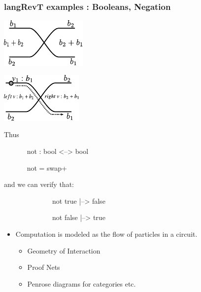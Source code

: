 \documentclass[svgnames,11pt]{beamer}
\begin{document}
\begin{frame}
\frametitle{ {{langRevT}} examples : Booleans, Negation  }

\vfill


 

\begin{multicols}{2}
\begin{center}
  \includegraphics{diagrams/thesis/swap_plus.pdf}
\end{center}


\begin{center}
  \includegraphics{diagrams/thesis/swap_plus_value.pdf}
\end{center}
  
\end{multicols}


\begin{small}
  \begin{multicols}{2}

    Thus

    {{~~~~~~ not : bool <--> bool }}

    {{~~~~~~ not = swap+}} 

    and we can verify that: 

    {{~~~~~~~~~~~~~~not true |--> false}}

    {{~~~~~~~~~~~~~~not false |--> true}}

    
  \end{multicols}
\end{small}

    \begin{itemize}
    \item Computation is modeled as the flow of particles in a
      circuit.

      \begin{itemize}
      \item Geometry of Interaction
      \item Proof Nets 
      \item Penrose diagrams for categories etc.
      \end{itemize}
    \end{itemize}

\vfill

\end{frame}
\end{document}
